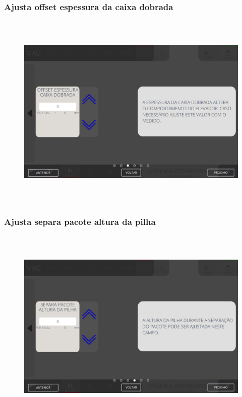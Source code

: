 \newpage
\thispagestyle{fancy}
\vspace*{40 pt}
\subsubsection{\small{Ajusta offset espessura da caixa dobrada}}
\vspace*{\fill}
\begin{figure}[h]
  \centering
  \includegraphics[width=576px,height=360px]{src/imagesFlexo/08-count/settings/e-9.png}
\end{figure}
\vspace*{\fill}


\newpage
\thispagestyle{fancy}
\vspace*{40 pt}
\subsubsection{\small{Ajusta separa pacote altura da pilha}}
\vspace*{\fill}
\begin{figure}[h]
  \centering
  \includegraphics[width=576px,height=360px]{src/imagesFlexo/08-count/settings/e-10.png}
\end{figure}
\vspace*{\fill}


